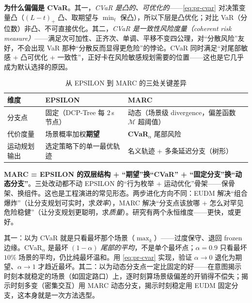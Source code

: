 \begin{insight}
\textbf{为什么偏偏是 CVaR}。其一，\emph{CVaR 是凸的、可优化的}——\cref{eq:pr-cvar} 对决策变量凸（$(L-t)_+$ 凸、取期望与 $\min_t$ 保凸），所以下层是凸优化；对比 VaR（分位数）非凸、不可直接优化。其二，\emph{CVaR 是一致性风险度量（coherent risk measure）}——满足次可加性、正齐次、单调、平移不变四公理，对“分散风险”友好，不会出现 VaR 那种“分散反而显得更危险”的悖论。CVaR 同时满足“对尾部敏感 + 凸可优化 + 一致性”，正好卡在风险敏感规划需要的位置——这也是它几乎成为默认选择的原因。
\end{insight}

\begin{table}[H]\centering\small
\caption{从 EPSILON 到 MARC 的三处关键差异}
\label{tab:pr-marc}
\begin{tabular}{lll}
\toprule
维度 & EPSILON & MARC \\
\midrule
分支点 & 固定（DCP-Tree 每 $2\,$s 节点） & 动态（场景级 divergence，偏差函数 $\mathcal{M}$ 超阈值） \\
代价度量 & 场景概率加权\textbf{期望} & \textbf{CVaR$_\alpha$} 尾部风险 \\
运动规划输出 & 选定策略下的单一最优轨迹 & 名义轨迹 + 多条延迟分支（树形） \\
\bottomrule
\end{tabular}
\end{table}

\begin{insight}
\textbf{MARC = EPSILON 的双层结构 + “期望”换“CVaR” + “固定分支”换“动态分支”}。三处改动都不动 EPSILON 的“行为枚举 + 运动优化”骨架——保骨架、换组件。这也是工程演进的常见形态。两步进化方向不同：EUDM 解决“组合爆炸”（让分支规划可实时，求\emph{效率}），MARC 解决“分支点该放哪 + 怎么对罕见危险稳健”（让分支规划更聪明，求\emph{质量}）。研究有两个永恒维度——更快，或更好。
\end{insight}

\begin{pitfall}
其一：以为 CVaR 就是只看最坏那个场景（$\max_k$）——过度保守、退回 frozen 边缘。CVaR$_\alpha$ 是最坏 $(1-\alpha)$ \emph{尾部的平均}，不是单个最坏点；$\alpha=0.9$ 只看最坏 $10\%$ 场景的平均，仍比纯最坏温和。用 \cref{eq:pr-cvar} 实现，验证 $\alpha\to0$ 退化为期望、$\alpha\to1$ 才趋近最坏。其二：以为动态分支点一定比固定的好——在意图揭示时刻本就稳定的场景（如固定路口）上，逐时刻算场景级偏差的开销得不偿失；揭示时刻多变（密集交互）用 MARC 动态分支，揭示时刻稳定用 EUDM 固定分支，这本身就是一次方法选型。
\end{pitfall}

